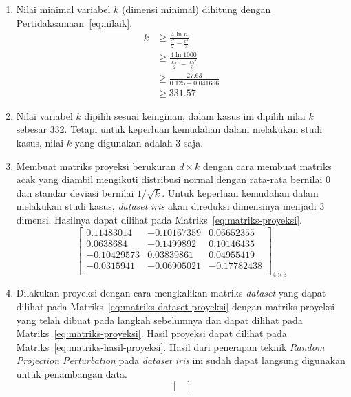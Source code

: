 \begin{enumerate}
    \item Nilai minimal variabel \(k\) (dimensi minimal) dihitung dengan Pertidaksamaan~\ref{eq:nilaik}.
    \begin{align*}
        k &\geq \frac{4\ln{n}}{\frac{\epsilon^{2}}{2}-\frac{\epsilon^{3}}{3}} \\
        &\geq \frac{4\ln{1000}}{\frac{0.5^{2}}{2}-\frac{0.5^{3}}{3}} \\
        &\geq \frac{27.63}{0.125-0.041666} \\
        &\geq 331.57
    \end{align*}
    \item Nilai variabel \(k\) dipilih sesuai keinginan, dalam kasus ini dipilih nilai \(k\) sebesar 332. Tetapi untuk keperluan kemudahan dalam melakukan studi kasus, nilai \(k\) yang digunakan adalah 3 saja.
    \item Membuat matriks proyeksi berukuran \(d \times k\) dengan cara membuat matriks acak yang diambil mengikuti distribusi normal dengan rata-rata bernilai 0 dan standar deviasi bernilai \(1/\sqrt{k}\). Untuk keperluan kemudahan dalam melakukan studi kasus, \textit{dataset} \textit{iris} akan direduksi dimensinya menjadi 3 dimensi. Hasilnya dapat dilihat pada Matriks~\ref{eq:matriks-proyeksi}.
    \begin{equation}\label{eq:matriks-proyeksi}
        \begin{bmatrix}
        0.11483014 &  -0.10167359  &  0.06652355 \\
        0.0638684 &   -0.1499892   &  0.10146435 \\
        -0.10429573 &   0.03839861 &   0.04955419 \\
        -0.0315941  &  -0.06905021  & -0.17782438 \\
        \end{bmatrix}_{4\times 3}
    \end{equation}
    \item Dilakukan proyeksi dengan cara mengkalikan matriks \textit{dataset} yang dapat dilihat pada Matriks~\ref{eq:matriks-dataset-proyeksi} dengan matriks proyeksi yang telah dibuat pada langkah sebelumnya dan dapat dilihat pada Matriks~\ref{eq:matriks-proyeksi}. Hasil proyeksi dapat dilihat pada Matriks~\ref{eq:matriks-hasil-proyeksi}. Hasil dari penerapan teknik \textit{Random Projection Perturbation} pada \textit{dataset iris} ini sudah dapat langsung digunakan untuk penambangan data.
    \begin{equation}\label{eq:matriks-hasil-proyeksi}
        \begin{bmatrix}

\end{bmatrix}
\end{equation}
\end{enumerate}
